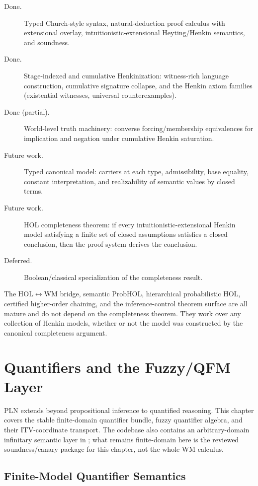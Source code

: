 \documentclass[11pt,openany]{report}
\begin{document}
\begin{description}
\item[Done.] Typed Church-style syntax, natural-deduction proof calculus
  with extensional overlay, intuitionistic-extensional Heyting/Henkin
  semantics, and soundness.
\item[Done.] Stage-indexed and cumulative Henkinization: witness-rich language
  construction, cumulative signature collapse, and the Henkin axiom families
  (existential witnesses, universal counterexamples).
\item[Done (partial).] World-level truth machinery: converse forcing/membership
  equivalences for implication and negation under cumulative Henkin saturation.
\item[Future work.] Typed canonical model: carriers at each type, admissibility,
  base equality, constant interpretation, and realizability of semantic values by
  closed terms.
\item[Future work.] HOL completeness theorem: if every intuitionistic-extensional
  Henkin model satisfying a finite set of closed assumptions satisfies a closed
  conclusion, then the proof system derives the conclusion.
\item[Deferred.] Boolean/classical specialization of the completeness result.
\end{description}

The HOL$\leftrightarrow$WM bridge, semantic ProbHOL, hierarchical probabilistic
HOL, certified higher-order chaining, and the inference-control theorem surface
are all mature and do not depend on the completeness theorem.  They work over
any collection of Henkin models, whether or not the model was constructed by the
canonical completeness argument.


\chapter{Quantifiers and the Fuzzy/QFM Layer}
\label{ch:quantifiers}

PLN extends beyond propositional inference to quantified reasoning.
This chapter covers the stable finite-domain quantifier bundle, fuzzy
quantifier algebra, and their ITV-coordinate transport.  The codebase
also contains an arbitrary-domain infinitary semantic layer in
; what remains
finite-domain here is the reviewed soundness/canary package for this
chapter, not the whole WM calculus.

\section{Finite-Model Quantifier Semantics}
\end{document}
